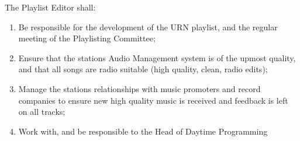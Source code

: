 \item The Playlist Editor shall:
\begin{enumerate}[label*=\arabic*.]
    \item Be responsible for the development of the URN playlist, and the regular meeting of the Playlisting Committee;
    \item Ensure that the stations Audio Management system is of the upmost quality, and that all songs are radio suitable (high quality, clean, radio edits);
    \item Manage the stations relationships with music promoters and record companies to ensure new high quality music is received and feedback is left on all tracks;
    \item Work with, and be responsible to the Head of Daytime Programming
\end{enumerate}
